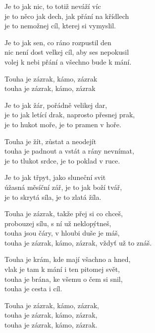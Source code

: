 
\ve{}
Je to jak nic, to totiž neváží víc\\
je to něco jak dech, jak přání na křídlech\\
je to nemožnej cíl, kterej si vymyslil.

\ve{}
Je to jak sen, co ráno rozpustil den\\
nic není dost velkej cíl, aby ses nepokusil\\
volej k nebi přání a všechno bude k mání.

\cho{}
Touha je zázrak, kámo, zázrak \\
touha je zázrak, kámo, zázrak 

\ve{}
Je to jak žár, pořádně velikej dar,\\
je to jak letící drak, naprosto přesnej prak,\\
je to hukot moře, je to pramen v hoře.

\ve{}
Touha je žít, zůstat a neodejít\\
touha je padnout a vstát a rány nevnímat,\\
je to tlukot srdce, je to poklad v ruce.

\ve{}
Je to jak třpyt, jako sluneční svit\\
úžasná měsíční zář, je to jak boží tvář,\\
je to skrytá síla, je to zlatá žíla.

\ve{}
Touha je zázrak, takže přej si co chceš,\\
probouzej sílu, s ní už neklopýtneš,\\
touha jsou čáry, v hloubi duše je máš,\\
touha je zázrak, kámo, zázrak, vždyť už to znáš.

\ve{}
Touha je krám, kde mají všachno a hned,\\
vlak je tam k mání i ten pitomej svět,\\
touha je brána, ke všemu o čem si snil,\\
touha je cesta i cíl.

\cho{}
Touha je zázrak, kámo, zázrak,\\
touha je zázrak, kámo, zázrak,\\
touha je zázrak, kámo, zázrak.
\esong